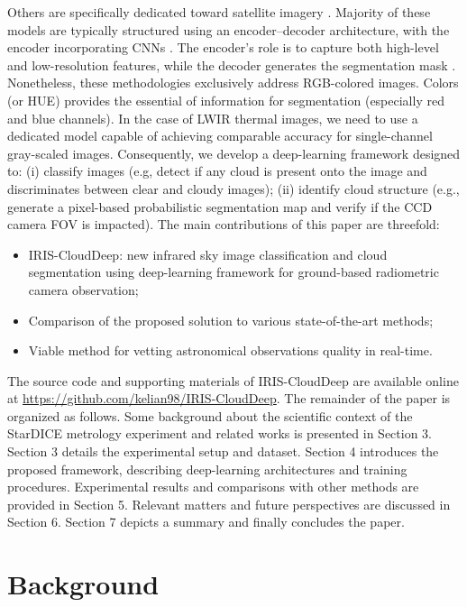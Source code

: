 \documentclass[amt, article]{copernicus}
\begin{document}
Others are specifically dedicated toward satellite imagery \cite{kim2018deep, kanu2020cloudx, chen2023novel}. Majority of these models are typically structured using an encoder–decoder architecture, with the encoder incorporating CNNs \citep{oshea2015introduction}. The encoder's role is to capture both high-level and low-resolution features, while the decoder generates the segmentation mask \citep{badrinarayanan2017segnet, Alzubaidi2021ReviewOD}. Nonetheless, these methodologies exclusively address RGB-colored images. Colors (or HUE) provides the essential of information for segmentation (especially red and blue channels). In the case of LWIR thermal images, we need to use a dedicated model capable of achieving comparable accuracy for single-channel gray-scaled images. Consequently, we develop a deep-learning framework designed to: (i) classify images (e.g, detect if any cloud is present onto the image and discriminates between clear and cloudy images); (ii) identify cloud structure (e.g., generate a pixel-based probabilistic segmentation map and verify if the CCD camera FOV is impacted).
The main contributions of this paper are threefold:
\begin{itemize}
    \item IRIS-CloudDeep: new infrared sky image classification and cloud segmentation using deep-learning framework for ground-based radiometric camera observation;
    \item Comparison of the proposed solution to various state-of-the-art methods;
    \item Viable method for vetting astronomical observations quality in real-time.
\end{itemize}
The source code and supporting materials of IRIS-CloudDeep are available online at \url{https://github.com/kelian98/IRIS-CloudDeep}.
The remainder of the paper is organized as follows. Some background about the scientific context of the StarDICE metrology experiment and related works is presented in Section 3. Section 3 details the experimental setup and dataset. Section 4 introduces the proposed framework, describing deep-learning architectures and training procedures. Experimental results and comparisons with other methods are provided in Section 5. Relevant matters and future perspectives are discussed in Section 6. Section 7 depicts a summary and finally concludes the paper.

\section{Background}
\end{document}
